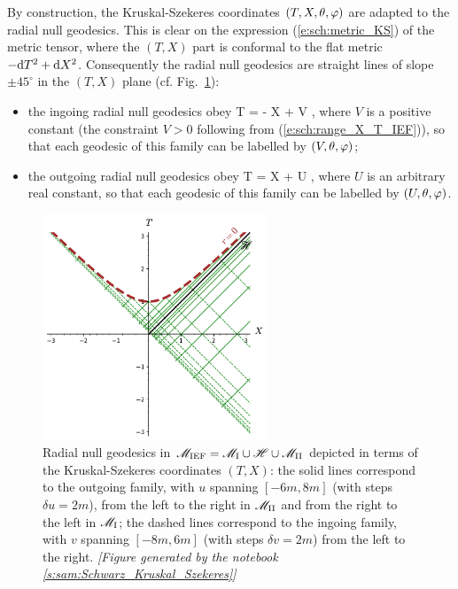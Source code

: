 By construction, the Kruskal-Szekeres coordinates $(T,X,\theta,\varphi)$ are
adapted to the radial null geodesics. This is clear on the expression
(\ref{e:sch:metric_KS}) of the metric tensor, where the $(T,X)$ part is
conformal to the flat metric $- \mathrm{d} T^2 + \mathrm{d} X^2$. Consequently the radial
null geodesics are straight lines of slope $\pm 45^\circ$ in the $(T,X)$ plane
(cf. Fig.~\ref{f:sch:rad_null_geod_KS}):
\begin{itemize}
\item the ingoing radial null geodesics obey
\be \label{e:sch:ingoing_null_geod_KS}
    T = - X + V ,
\ee
where $V$ is a positive constant (the constraint $V>0$ following from (\ref{e:sch:range_X_T_IEF})), so that each geodesic of this family can be labelled
by $(V,\theta,\varphi)$;
\item the outgoing radial null geodesics obey
\be \label{e:sch:outgoing_null_geod_KS}
    T = X + U ,
\ee
where $U$ is an arbitrary real constant, so that each geodesic of this family can be labelled
by $(U,\theta,\varphi)$.
\end{itemize}
\begin{figure}
\centerline{\includegraphics[width=0.6\textwidth]{max_rad_null_geod_KS.pdf}}
\caption[]{\label{f:sch:rad_null_geod_KS} \footnotesize
Radial null geodesics in $\mathscr{M}_{\rm IEF} = \mathscr{M}_{\rm I}\cup\mathscr{H}\cup\mathscr{M}_{\rm II}$
depicted in terms of the Kruskal-Szekeres coordinates $(T,X)$: the solid
lines correspond to the outgoing family, with $u$ spanning $[-6m, 8m]$
(with steps $\delta u = 2m$), from the left to the right in $\mathscr{M}_{\rm II}$
and from the right to the left in $\mathscr{M}_{\rm I}$; the dashed lines
correspond to the ingoing family, with $v$ spanning $[-8m, 6m]$ (with steps $\delta v = 2m$)
from the left to the right.
\textsl{[Figure generated by the notebook \ref{s:sam:Schwarz_Kruskal_Szekeres}]}
}
\end{figure}
